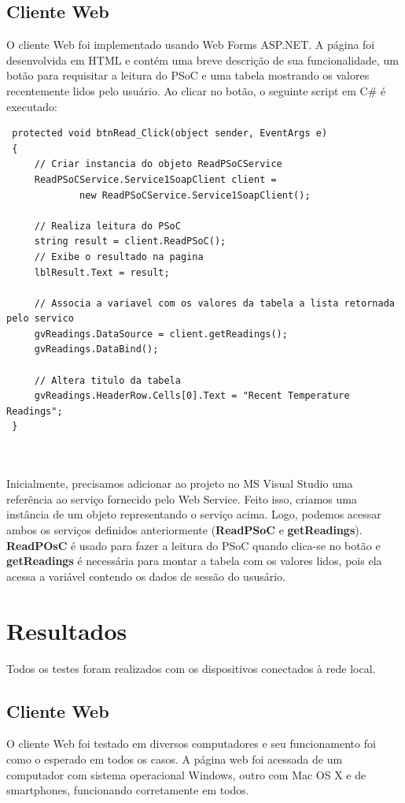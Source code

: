 \documentclass[a4paper,12pt,titlepage]{article}
\begin{document}
	\subsection{Cliente Web}
		O cliente Web foi implementado usando Web Forms ASP.NET. A página foi desenvolvida em HTML e contém uma breve descrição de sua funcionalidade, um botão para requisitar a leitura do PSoC e uma tabela mostrando os valores recentemente lidos pelo usuário. Ao clicar no botão, o seguinte script em C\# é executado:
			\begin{lstlisting}	
 protected void btnRead_Click(object sender, EventArgs e)
 {
	 // Criar instancia do objeto ReadPSoCService
	 ReadPSoCService.Service1SoapClient client =
			 new ReadPSoCService.Service1SoapClient();
 
	 // Realiza leitura do PSoC
	 string result = client.ReadPSoC();
	 // Exibe o resultado na pagina
	 lblResult.Text = result;
 
	 // Associa a variavel com os valores da tabela a lista retornada pelo servico
	 gvReadings.DataSource = client.getReadings();
	 gvReadings.DataBind();
	
	 // Altera titulo da tabela 
	 gvReadings.HeaderRow.Cells[0].Text = "Recent Temperature Readings";
 }
 
 
	 		\end{lstlisting}
			Inicialmente, precisamos adicionar ao projeto no MS Visual Studio uma referência ao serviço fornecido pelo Web Service. Feito isso, criamos uma instância de um objeto representando o serviço acima. Logo, podemos acessar ambos os serviços definidos anteriormente (\textbf{ReadPSoC} e \textbf{getReadings}). \textbf{ReadPOsC} é usado para fazer a leitura do PSoC quando clica-se no botão e \textbf{getReadings} é necessária para montar a tabela com os valores lidos, pois ela acessa a variável contendo os dados de sessão do ususário. 
			 
		
\section{Resultados}
	Todos os testes foram realizados com os dispositivos conectados à rede local.  
	\subsection{Cliente Web}
	O cliente Web foi testado em diversos computadores e seu funcionamento foi como o esperado em todos os casos. A página web foi acessada de um computador com sistema operacional Windows, outro com Mac OS X e de smartphones, funcionando corretamente em todos. 
	
\end{document}
